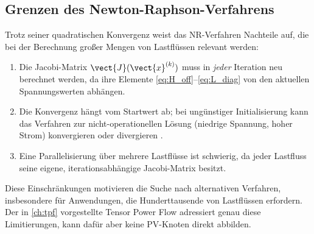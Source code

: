 \subsection{Grenzen des Newton-Raphson-Verfahrens}
\label{subsec:nr_grenzen}

Trotz seiner quadratischen Konvergenz weist das NR-Verfahren Nachteile auf, die bei der Berechnung großer Mengen von Lastflüssen relevant werden:
\begin{enumerate}
	\item Die Jacobi-Matrix $\vect{J}(\vect{x}^{(k)})$ muss in \textit{jeder} Iteration neu berechnet werden, da ihre Elemente \eqref{eq:H_off}--\eqref{eq:L_diag} von den aktuellen Spannungswerten abhängen.
	\item Die Konvergenz hängt vom Startwert ab; bei ungünstiger Initialisierung kann das Verfahren zur nicht-operationellen Lösung (niedrige Spannung, hoher Strom) konvergieren oder divergieren \cite{Salazar2024}.
	\item Eine Parallelisierung über mehrere Lastflüsse ist schwierig, da jeder Lastfluss seine eigene, iterationsabhängige Jacobi-Matrix besitzt.
\end{enumerate}

Diese Einschränkungen motivieren die Suche nach alternativen Verfahren, insbesondere für Anwendungen, die Hunderttausende von Lastflüssen erfordern. Der in \cref{ch:tpf} vorgestellte Tensor Power Flow adressiert genau diese Limitierungen, kann dafür aber keine PV-Knoten direkt abbilden.

